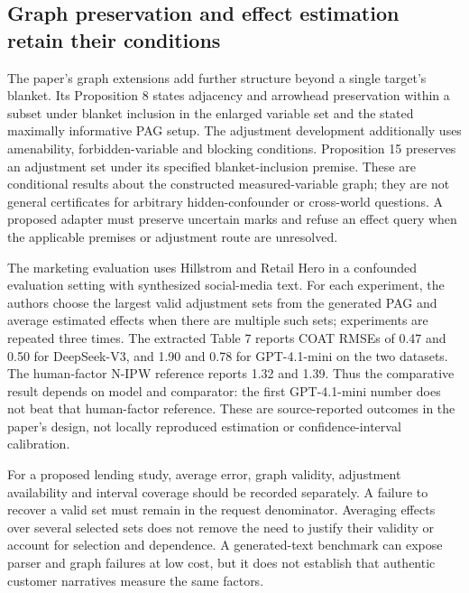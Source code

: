 \subsection{Graph preservation and effect estimation retain their conditions}
\label{exec19:coat-graph}
The paper's graph extensions add further structure beyond a single target's
blanket. Its Proposition 8 states adjacency and arrowhead preservation within
a subset under blanket inclusion in the enlarged variable set and the stated
maximally informative PAG setup. The adjustment development additionally uses
amenability, forbidden-variable and blocking conditions. Proposition 15
preserves an adjustment set under its specified blanket-inclusion premise.
These are conditional results about the constructed measured-variable graph;
they are not general certificates for arbitrary hidden-confounder or
cross-world questions. A proposed adapter must preserve uncertain marks and
refuse an effect query when the applicable premises or adjustment route are
unresolved.\citep{exec19_coat}

The marketing evaluation uses Hillstrom and Retail Hero in a confounded
evaluation setting with synthesized social-media text. For each experiment,
the authors choose the largest valid adjustment sets from the generated PAG
and average estimated effects when there are multiple such sets; experiments
are repeated three times. The extracted Table 7 reports COAT RMSEs of
0.47 and 0.50 for DeepSeek-V3, and 1.90 and 0.78 for GPT-4.1-mini on the
two datasets. The human-factor N-IPW reference reports 1.32 and 1.39.
Thus the comparative result depends on model and comparator: the first
GPT-4.1-mini number does not beat that human-factor reference. These are
source-reported outcomes in the paper's design, not locally reproduced
estimation or confidence-interval calibration.\citep{exec19_coat}

For a proposed lending study, average error, graph validity, adjustment
availability and interval coverage should be recorded separately. A failure
to recover a valid set must remain in the request denominator. Averaging
effects over several selected sets does not remove the need to justify their
validity or account for selection and dependence. A generated-text benchmark
can expose parser and graph failures at low cost, but it does not establish
that authentic customer narratives measure the same factors.

